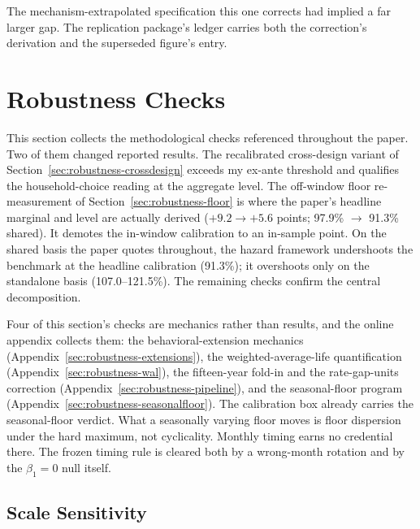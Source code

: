 \documentclass[12pt]{article}
\begin{document}
The mechanism-extrapolated specification this one corrects had implied a far larger gap. The replication package's ledger carries both the correction's derivation and the superseded figure's entry.

\section{Robustness Checks}\label{sec:robustness}

This section collects the methodological checks referenced throughout the paper. Two of them changed reported results. The recalibrated cross-design variant of Section~\ref{sec:robustness-crossdesign} exceeds my ex-ante threshold and qualifies the household-choice reading at the aggregate level. The off-window floor re-measurement of Section~\ref{sec:robustness-floor} is where the paper's headline marginal and level are actually derived ($+9.2 \to +5.6$ points; 97.9\% $\to$ 91.3\% shared). It demotes the in-window calibration to an in-sample point. On the shared basis the paper quotes throughout, the hazard framework undershoots the benchmark at the headline calibration (91.3\%); it overshoots only on the standalone basis (107.0--121.5\%). The remaining checks confirm the central decomposition.

Four of this section's checks are mechanics rather than results, and the online appendix collects them: the behavioral-extension mechanics (Appendix~\ref{sec:robustness-extensions}), the weighted-average-life quantification (Appendix~\ref{sec:robustness-wal}), the fifteen-year fold-in and the rate-gap-units correction (Appendix~\ref{sec:robustness-pipeline}), and the seasonal-floor program (Appendix~\ref{sec:robustness-seasonalfloor}). The calibration box already carries the seasonal-floor verdict. What a seasonally varying floor moves is floor dispersion under the hard maximum, not cyclicality. Monthly timing earns no credential there. The frozen timing rule is cleared both by a wrong-month rotation and by the $\beta_1 = 0$ null itself.

\subsection{Scale Sensitivity}\label{sec:robustness-scale}
\end{document}

